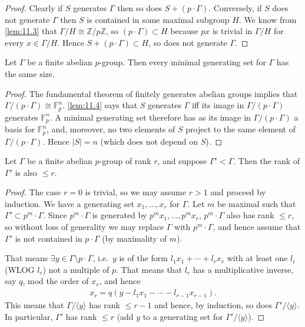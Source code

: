 \documentclass{article}
\numberwithin{equation}{section}
\begin{document}
\begin{proof}
  Clearly if $S$ generates $\Gamma$ then so does $S + (p \cdot \Gamma)$.
  Conversely, if $S$ does not generate $\Gamma$ then $S$ is contained in some maximal subgroup $H$.
  We know from \cref{lem:11.3} that $\Gamma/H \cong \mathbb{Z}/p\mathbb{Z}$, so $(p \cdot \Gamma) \subset H$ because $px$ is trivial in $\Gamma/H$ for every $x \in \Gamma/H$.
  Hence $S + (p \cdot \Gamma) \subset H$, so does not generate $\Gamma$.
\end{proof}
\begin{ncor}\label{cor:11.5}
  Let $\Gamma$ be a finite abelian $p$-group. Then every minimal generating set for $\Gamma$ has the same size.
\end{ncor}
\begin{proof}
  The fundamental theorem of finitely generates abelian groups implies that $\Gamma/(p \cdot \Gamma) \cong \mathbb{F}_p^n$.
  \cref{lem:11.4} says that $S$ generates $\Gamma$ iff its image in $\Gamma/(p \cdot \Gamma)$ generates $\mathbb{F}_p^n$.
  A minimal generating set therefore has as its image in $\Gamma/(p \cdot \Gamma)$ a basis for $\mathbb{F}_p^n$, and, moreover, no two elements of $S$ project to the same element of $\Gamma/(p \cdot \Gamma)$.
  Hence $|S|=n$ (which does not depend on $S$).
\end{proof}
\begin{nlemma}\label{lem:11.6}
  Let $\Gamma$ be a finite abelian $p$-group of rank $r$, and suppose $\Gamma' < \Gamma$. Then the rank of $\Gamma'$ is also $\leq r$.
\end{nlemma}
\begin{proof}
  The case $r=0$ is trivial, so we may assume $r > 1$ and proceed by induction.
  We have a generating set $x_1, \dotsc, x_r$ for $\Gamma$. Let $m$ be maximal such that $\Gamma' \subset p^m \cdot \Gamma$.
  Since $p^m \cdot \Gamma$ is generated by $p^m x_1, \dotsc, p^m x_r$, $p^m \cdot \Gamma$ also has rank $\leq r$, so without loss of generality we may replace $\Gamma$ with $p^m \cdot \Gamma$, and hence assume that $\Gamma'$ is not contained in $p \cdot \Gamma$ (by maximality of $m$).

  That means $\exists y \in \Gamma \setminus p \cdot \Gamma$, i.e.\ $y$ is of the form $l_1 x_1 + \dotsb + l_r x_r$ with at least one $l_i$ (WLOG $l_r$) not a multiple of $p$.
  That means that $l_r$ has a multiplicative inverse, say $q$, mod the order of $x_r$, and hence
  \begin{align*}
    x_r = q (y - l_1 x_1 - \dotsb - l_{r-1} x_{r-1}).
  \end{align*}
  This means that $\Gamma / \langle y \rangle$ has rank $\leq r-1$ and hence, by induction, so does $\Gamma' / \langle  y \rangle$.
  In particular, $\Gamma'$ has rank $\leq r$ (add $y$ to a generating set for $\Gamma' / \langle y \rangle$).
\end{proof}
\end{document}
